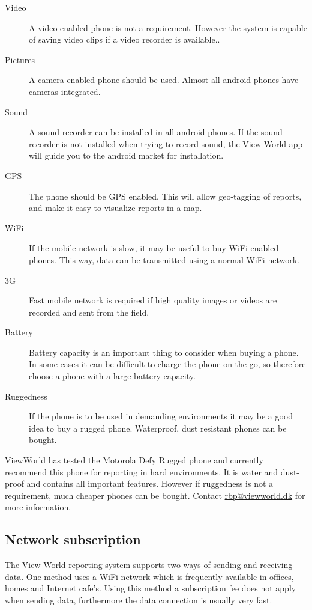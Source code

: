 \documentclass[a4paper, 12pt, final]{article}
\begin{document}
\begin{description}
\item[Video] A video enabled phone is not a requirement. However the system is capable of saving video clips if a video recorder is available..
\item[Pictures] A camera enabled phone should be used. Almost all android phones have cameras integrated. 
\item[Sound] A sound recorder can be installed in all android phones. If the sound recorder is not installed when trying to record sound, the View World app will guide you to the android market for installation.
\item[GPS] The phone should be GPS enabled. This will allow geo-tagging of reports, and make it easy to visualize reports in a map.
\item[WiFi] If the mobile network is slow, it may be useful to buy WiFi enabled phones. This way, data can be transmitted using a normal WiFi network.
\item[3G] Fast mobile network is required if high quality images or videos are recorded and sent from the field.
\item[Battery] Battery capacity is an important thing to consider when buying a phone. In some cases it can be difficult to charge the phone on the go, so therefore choose a phone with a large battery capacity.
\item[Ruggedness] If the phone is to be used in demanding environments it may be a good idea to buy a rugged phone. Waterproof, dust resistant phones can be bought.
\end{description}

ViewWorld has tested the Motorola Defy Rugged phone and currently recommend this phone for reporting in hard environments. It is water and dust-proof and contains all important features. However if ruggedness is not a requirement, much cheaper phones can be bought. Contact \url{rbp@viewworld.dk} for more information.

\subsection{Network subscription}

The View World reporting system supports two ways of sending and receiving data. 
One method uses a WiFi network which is frequently available in offices, homes and Internet cafe's. Using this method a subscription fee does not apply when sending data, furthermore the data connection is usually very fast.
\end{document}
